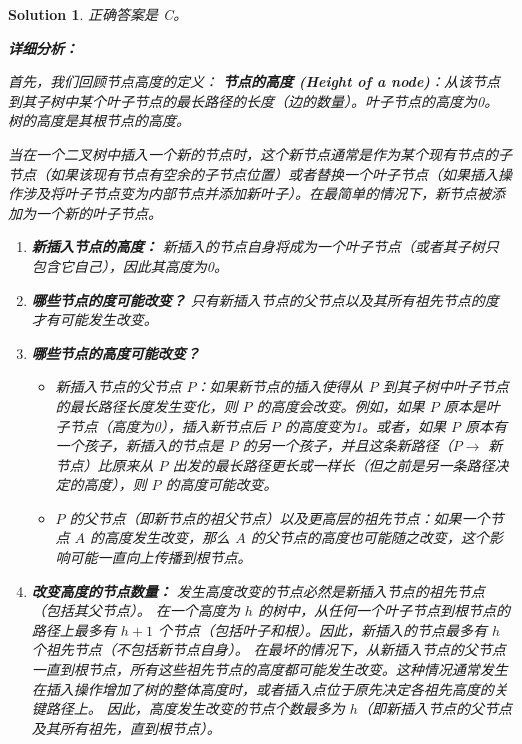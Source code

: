 \documentclass[UTF8]{report}
\newtheorem{solution}{Solution}
\theoremstyle{MyLineTheoremStyle} %
\theoremstyle{MyBlockTheoremStyle} %
\theoremstyle{MySubsubsectionStyle} %
\begin{document}
\begin{solution}
正确答案是 C。

\textbf{详细分析：}

首先，我们回顾节点高度的定义：
\textbf{节点的高度 (Height of a node)}：从该节点到其子树中某个叶子节点的最长路径的长度（边的数量）。叶子节点的高度为0。
树的高度是其根节点的高度。

当在一个二叉树中插入一个新的节点时，这个新节点通常是作为某个现有节点的子节点（如果该现有节点有空余的子节点位置）或者替换一个叶子节点（如果插入操作涉及将叶子节点变为内部节点并添加新叶子）。在最简单的情况下，新节点被添加为一个新的叶子节点。

\begin{enumerate}
    \item \textbf{新插入节点的高度：} 新插入的节点自身将成为一个叶子节点（或者其子树只包含它自己），因此其高度为0。

    \item \textbf{哪些节点的度可能改变？}
        只有新插入节点的父节点以及其所有祖先节点的度才有可能发生改变。

    \item \textbf{哪些节点的高度可能改变？}
        \begin{itemize}
            \item 新插入节点的父节点 $P$：如果新节点的插入使得从 $P$ 到其子树中叶子节点的最长路径长度发生变化，则 $P$ 的高度会改变。例如，如果 $P$ 原本是叶子节点（高度为0），插入新节点后 $P$ 的高度变为1。或者，如果 $P$ 原本有一个孩子，新插入的节点是 $P$ 的另一个孩子，并且这条新路径（$P \rightarrow$ 新节点）比原来从 $P$ 出发的最长路径更长或一样长（但之前是另一条路径决定的高度），则 $P$ 的高度可能改变。
            \item $P$ 的父节点（即新节点的祖父节点）以及更高层的祖先节点：如果一个节点 $A$ 的高度发生改变，那么 $A$ 的父节点的高度也可能随之改变，这个影响可能一直向上传播到根节点。
        \end{itemize}

    \item \textbf{改变高度的节点数量：}
        发生高度改变的节点必然是新插入节点的祖先节点（包括其父节点）。
        在一个高度为 $h$ 的树中，从任何一个叶子节点到根节点的路径上最多有 $h+1$ 个节点（包括叶子和根）。因此，新插入的节点最多有 $h$ 个祖先节点（不包括新节点自身）。
        在最坏的情况下，从新插入节点的父节点一直到根节点，所有这些祖先节点的高度都可能发生改变。这种情况通常发生在插入操作增加了树的整体高度时，或者插入点位于原先决定各祖先高度的关键路径上。
        因此，高度发生改变的节点个数最多为 $h$（即新插入节点的父节点及其所有祖先，直到根节点）。


\end{enumerate}
\end{solution}
\end{document}
